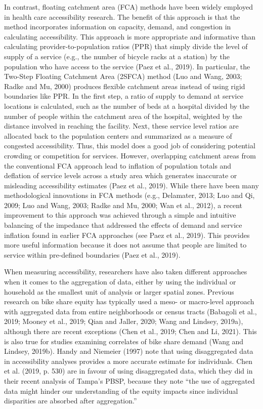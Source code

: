 \documentclass[]{elsarticle} %
\begin{document}
In contrast, floating catchment area (FCA) methods have been widely
employed in health care accessibility research. The benefit of this
approach is that the method incorporates information on capacity,
demand, and congestion in calculating accessibility. This approach is
more appropriate and informative than calculating provider-to-population
ratios (PPR) that simply divide the level of supply of a service (e.g.,
the number of bicycle racks at a station) by the population who have
access to the service (Paez et al., 2019). In particular, the Two-Step
Floating Catchment Area (2SFCA) method (Luo and Wang, 2003; Radke and
Mu, 2000) produces flexible catchment areas instead of using rigid
boundaries like PPR. In the first step, a ratio of supply to demand at
service locations is calculated, such as the number of beds at a
hospital divided by the number of people within the catchment area of
the hospital, weighted by the distance involved in reaching the
facility. Next, these service level ratios are allocated back to the
population centers and summarized as a measure of congested
accessibility. Thus, this model does a good job of considering potential
crowding or competition for services. However, overlapping catchment
areas from the conventional FCA approach lead to inflation of population
totals and deflation of service levels across a study area which
generates inaccurate or misleading accessibility estimates (Paez et al.,
2019). While there have been many methodological innovations in FCA
methods (e.g., Delamater, 2013; Luo and Qi, 2009; Luo and Wang, 2003;
Radke and Mu, 2000; Wan et al., 2012), a recent improvement to this
approach was achieved through a simple and intuitive balancing of the
impedance that addressed the effects of demand and service inflation
found in earlier FCA approaches (see Paez et al., 2019). This provides
more useful information because it does not assume that people are
limited to service within pre-defined boundaries (Paez et al., 2019).

When measuring accessibility, researchers have also taken different
approaches when it comes to the aggregation of data, either by using the
individual or household as the smallest unit of analysis or larger
spatial zones. Previous research on bike share equity has typically used
a meso- or macro-level approach with aggregated data from entire
neighborhoods or census tracts (Babagoli et al., 2019; Mooney et al.,
2019; Qian and Jaller, 2020; Wang and Lindsey, 2019a), although there
are recent exceptions (Chen et al., 2019; Chen and Li, 2021). This is
also true for studies examining correlates of bike share demand (Wang
and Lindsey, 2019b). Handy and Niemeier (1997) note that using
disaggregated data in accessibility analyses provides a more accurate
estimate for individuals. Chen et al. (2019, p. 530) are in favour of
using disaggregated data, which they did in their recent analysis of
Tampa's PBSP, because they note ``the use of aggregated data might
hinder our understanding of the equity impacts since individual
disparities are absorbed after aggregation.''
\end{document}

